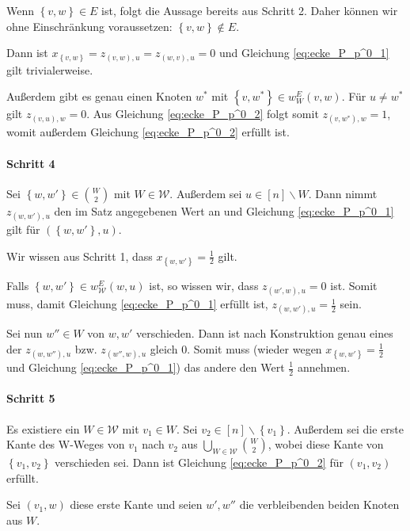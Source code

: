 \documentclass[10p,a4paper,BCOR = 12mm, DIV=15]{scrbook}
\begin{document}
{\begin{bew}
Wenn $\left\{v, w\right\} \in E$ ist, folgt die Aussage bereits aus Schritt 2. Daher können wir ohne Einschränkung voraussetzen: $\left\{v, w\right\} \notin E$.

Dann ist $x_{\left\{v, w\right\}} = z_{\left(v, w\right), u} = z_{\left(w, v\right), u} = 0$ und Gleichung \eqref{eq:ecke_P_p^0_1} gilt trivialerweise.

Außerdem gibt es genau einen Knoten $w^*$ mit $\left\{v, w^*\right\} \in w_W^E\left(v, w\right)$. Für $u \neq w^*$ gilt $z_{\left(v, u\right), w} = 0$. Aus Gleichung \eqref{eq:ecke_P_p^0_2} folgt somit $z_{\left(v, w^*\right), w} = 1$, womit außerdem Gleichung \eqref{eq:ecke_P_p^0_2} erfüllt ist.

\paragraph{Schritt 4} Sei $\left\{w, w'\right\} \in {W \choose 2}$ mit $W \in \mathcal{W}$. Außerdem sei $u \in \left[n\right] \backslash W$. Dann nimmt $z_{\left(w, w'\right), u}$ den im Satz angegebenen Wert an und Gleichung \eqref{eq:ecke_P_p^0_1} gilt für $\left(\left\{w, w'\right\}, u\right)$.

Wir wissen aus Schritt 1, dass $x_{\left\{w, w'\right\}} = \frac{1}{2}$ gilt. 

Falls $\left\{w, w'\right\} \in w_{\mathcal{W}}^E\left(w, u\right)$ ist, so wissen wir, dass $z_{\left(w', w\right), u} = 0$ ist. Somit muss, damit Gleichung \eqref{eq:ecke_P_p^0_1} erfüllt ist, $z_{\left(w, w'\right), u} = \frac{1}{2}$ sein.

Sei nun $w'' \in W$ von $w, w'$ verschieden. Dann ist nach Konstruktion genau eines der $z_{\left(w, w''\right), u}$ bzw. $z_{\left(w'', w\right), u}$ gleich 0. Somit muss (wieder wegen $x_{\left\{w, w'\right\}} = \frac{1}{2}$ und Gleichung \eqref{eq:ecke_P_p^0_1}) das andere den Wert $\frac{1}{2}$ annehmen.

\paragraph{Schritt 5} Es existiere ein $W  \in \mathcal{W}$ mit $v_1 \in W$. Sei $v_2 \in \left[n\right] \backslash \left\{v_1\right\}$. Außerdem sei die erste Kante des W-Weges von $v_1$ nach $v_2$ aus $\bigcup_{W \in \mathcal{W}} {W \choose 2}$, wobei diese Kante von $\left\{v_1, v_2\right\}$ verschieden sei.
Dann ist Gleichung \eqref{eq:ecke_P_p^0_2} für $\left(v_1, v_2\right)$ erfüllt.

Sei $\left(v_1, w\right)$ diese erste Kante und seien $w', w''$ die verbleibenden beiden Knoten aus $W$.


\end{bew}}
\end{document}
